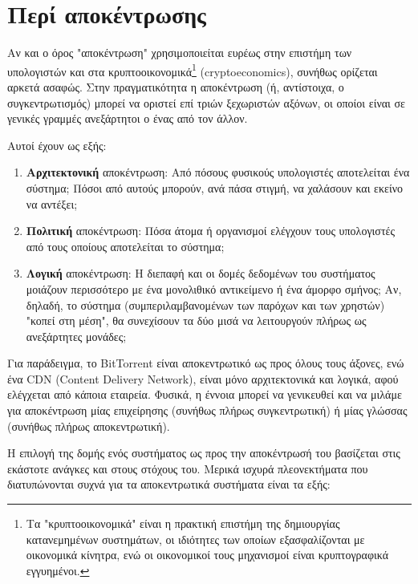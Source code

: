 \section{Περί αποκέντρωσης}\label{section:1-2-decentralization}

Αν και ο όρος "αποκέντρωση" χρησιμοποιείται ευρέως στην επιστήμη των υπολογιστών και στα κρυπτοοικονομικά\footnote{Τα "κρυπτοοικονομικά" είναι η πρακτική επιστήμη της δημιουργίας κατανεμημένων συστημάτων, οι ιδιότητες των οποίων εξασφαλίζονται με οικονομικά κίνητρα, ενώ οι οικονομικοί τους μηχανισμοί είναι κρυπτογραφικά εγγυημένοι.\cite{1.2-ethereum-learn}} (cryptoeconomics), συνήθως ορίζεται αρκετά ασαφώς. Στην πραγματικότητα η αποκέντρωση (ή, αντίστοιχα, ο συγκεντρωτισμός) μπορεί να οριστεί επί τριών ξεχωριστών αξόνων, οι οποίοι είναι σε γενικές γραμμές ανεξάρτητοι ο ένας από τον άλλον.\cite{1.2-the-meaning-of-decentralization}

Αυτοί έχουν ως εξής:

\begin{enumerate}
	\item \textbf{Αρχιτεκτονική} αποκέντρωση: Από πόσους φυσικούς υπολογιστές αποτελείται ένα σύστημα; Πόσοι από αυτούς μπορούν, ανά πάσα στιγμή, να χαλάσουν και εκείνο να αντέξει;
	\item \textbf{Πολιτική} αποκέντρωση: Πόσα άτομα ή οργανισμοί ελέγχουν τους υπολογιστές από τους οποίους αποτελείται το σύστημα;
	\item \textbf{Λογική} αποκέντρωση: Η διεπαφή και οι δομές δεδομένων του συστήματος μοιάζουν περισσότερο με ένα μονολιθικό αντικείμενο ή ένα άμορφο σμήνος; Αν, δηλαδή, το σύστημα (συμπεριλαμβανομένων των παρόχων και των χρηστών) "κοπεί στη μέση", θα συνεχίσουν τα δύο μισά να λειτουργούν πλήρως ως ανεξάρτητες μονάδες; 
\end{enumerate}

Για παράδειγμα, το BitTorrent είναι αποκεντρωτικό ως προς όλους τους άξονες, ενώ ένα CDN (Content Delivery Network), είναι μόνο αρχιτεκτονικά και λογικά, αφού ελέγχεται από κάποια εταιρεία. Φυσικά, η έννοια μπορεί να γενικευθεί και να μιλάμε για αποκέντρωση μίας επιχείρησης (συνήθως πλήρως συγκεντρωτική) ή μίας γλώσσας (συνήθως πλήρως αποκεντρωτική).

Η επιλογή της δομής ενός συστήματος ως προς την αποκέντρωσή του βασίζεται στις εκάστοτε ανάγκες και στους στόχους του. Μερικά ισχυρά πλεονεκτήματα που διατυπώνονται συχνά για τα αποκεντρωτικά συστήματα είναι τα εξής:

